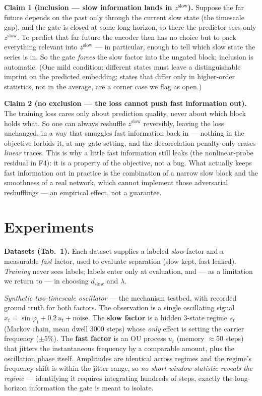 \documentclass[10pt,twocolumn]{article}
\begin{document}
\textbf{Claim 1 (inclusion --- slow information lands in $z^{\mathrm{slow}}$).}
Suppose the far future depends on the past only through the current slow state
(the timescale gap), and the gate is closed at some long horizon, so there the
predictor sees only $z^{\mathrm{slow}}$. To predict that far future the encoder
then has no choice but to pack everything relevant into $z^{\mathrm{slow}}$ ---
in particular, enough to tell which slow state the series is in. So the gate
\emph{forces} the slow factor into the ungated block; inclusion is automatic.
(One mild condition: different states must leave a distinguishable imprint on
the predicted embedding; states that differ only in higher-order statistics,
not in the average, are a corner case we flag as open.)

\textbf{Claim 2 (no exclusion --- the loss cannot push fast information out).}
The training loss cares only about prediction quality, never about which block
holds what. So one can always reshuffle $z^{\mathrm{slow}}$ reversibly, leaving
the loss unchanged, in a way that smuggles fast information back in --- nothing
in the objective forbids it, at any gate setting, and the decorrelation penalty
only erases \emph{linear} traces. This is why a little fast information still
leaks (the nonlinear-probe residual in F4): it is a property of the objective,
not a bug. What actually keeps fast information out in practice is the
combination of a narrow slow block and the smoothness of a real network, which
cannot implement those adversarial reshufflings --- an empirical effect, not a
guarantee.

\section{Experiments}
\textbf{Datasets (Tab.~1).} Each dataset supplies a labeled \emph{slow}
factor and a measurable \emph{fast} factor, used to evaluate separation
(slow kept, fast leaked). \emph{Training} never sees labels; labels enter only
at evaluation, and --- as a limitation we return to --- in choosing
$d_{\mathrm{slow}}$ and $\lambda$.

\emph{Synthetic two-timescale oscillator} --- the mechanism testbed, with
recorded ground truth for both factors. The observation is a single
oscillating signal $x_t=\sin\varphi_t+0.2\,u_t+\text{noise}$. The
\textbf{slow factor} is a hidden 3-state regime $s_t$ (Markov chain, mean
dwell 3000 steps) whose \emph{only} effect is setting the carrier frequency
($\pm5\%$). The \textbf{fast factor} is an OU process $u_t$ (memory
$\approx$50 steps) that jitters the instantaneous frequency by a comparable
amount, plus the oscillation phase itself. Amplitudes are identical across
regimes and the regime's frequency shift is within the jitter range, so
\emph{no short-window statistic reveals the regime} --- identifying it
requires integrating hundreds of steps, exactly the long-horizon information
the gate is meant to isolate.
\end{document}
